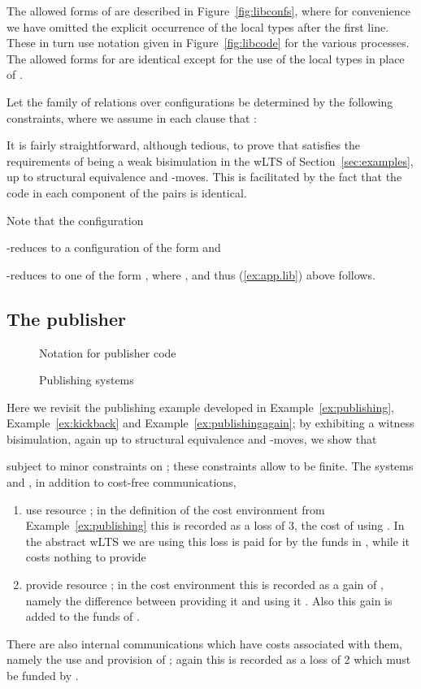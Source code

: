 \documentclass{LMCS}
\begin{document}
The allowed forms of  are described in Figure~\ref{fig:libconfs}, where for convenience we have omitted 
the explicit occurrence of the local types  after the first line. These in turn use 
notation given in Figure~\ref{fig:libcode} for the various processes.  
The allowed forms for  are identical  except for the use of the local types 
 in place of .

Let the family of relations over configurations  be determined by the following
constraints, where we assume in each clause that :

It is fairly straightforward, although tedious, to prove that
 satisfies the requirements of being  a weak
bisimulation in the wLTS of Section~\ref{sec:examples}, up to structural
equivalence and -moves. This is facilitated by the fact that
the code in each component of the pairs is identical.

Note that the configuration 

-reduces to a configuration of the form  and 

-reduces to one of the form , where ,  
and thus (\ref{ex:app.lib}) above follows. 

\subsection{The publisher}\label{sec:app.pub}



\begin{figure}[t]

  


  \caption{Notation for publisher code}
  \label{fig:pubcode}
\end{figure}



\begin{figure}[t]
  
  \caption{Publishing  systems}
  \label{fig:pubconfs}
\end{figure}


Here we revisit the publishing example developed in Example~\ref{ex:publishing}, Example~\ref{ex:kickback} and
Example~\ref{ex:publishingagain}; by exhibiting a witness bisimulation, again up to structural equivalence and 
-moves, we show that

subject to minor constraints on ; these constraints allow  to be finite. 
The systems  and , in addition to cost-free communications,
\begin{enumerate}[]
\item use resource ; in the definition of the cost environment from Example~\ref{ex:publishing} this is
recorded as a loss of 3, the cost of using . In the abstract wLTS we are using this loss is paid for by
the funds in , while it costs nothing to provide

\item provide resource ; in the cost environment this is recorded as a gain of , namely the difference between
providing it  and using it . Also this gain is added to the funds of .
\end{enumerate}
There are also internal communications which have costs associated with them, namely the use and provision of ; again
this is recorded as a loss of 2 which must be funded by . 
\end{document}
